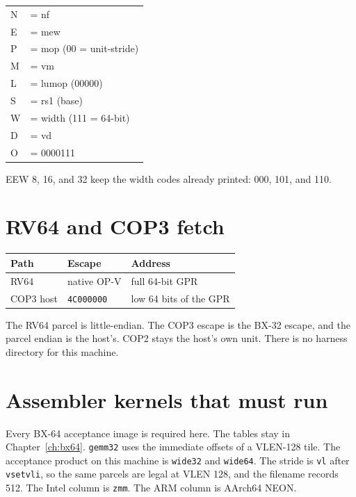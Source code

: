 \vspace{1.4ex}
\begin{center}
\begin{tabular}{@{}ll@{}}
N & = nf \\
E & = mew \\
P & = mop (00 = unit-stride) \\
M & = vm \\
L & = lumop (00000) \\
S & = rs1 (base) \\
W & = width (111 = 64-bit) \\
D & = vd \\
O & = 0000111 \\
\end{tabular}
\end{center}

EEW 8, 16, and 32 keep the width codes already printed: 000, 101, and 110.

\section{RV64 and COP3 fetch}

\begin{center}
\begin{tabular}{@{}lll@{}}
\toprule
Path & Escape & Address \\
\midrule
RV64 & native OP-V & full 64-bit GPR \\
COP3 host & \texttt{4C000000} & low 64 bits of the GPR \\
\bottomrule
\end{tabular}
\end{center}

The RV64 parcel is little-endian. The COP3 escape is the BX-32 escape, and the parcel endian is the host's. COP2 stays the host's own unit. There is no harness directory for this machine.

\section{Assembler kernels that must run}

Every BX-64 acceptance image is required here. The tables stay in Chapter~\ref{ch:bx64}. \texttt{gemm32} uses the immediate offsets of a VLEN-128 tile. The acceptance product on this machine is \texttt{wide32} and \texttt{wide64}. The stride is \texttt{vl} after \texttt{vsetvli}, so the same parcels are legal at VLEN 128, and the filename records 512. The Intel column is \texttt{zmm}. The ARM column is AArch64 NEON.

